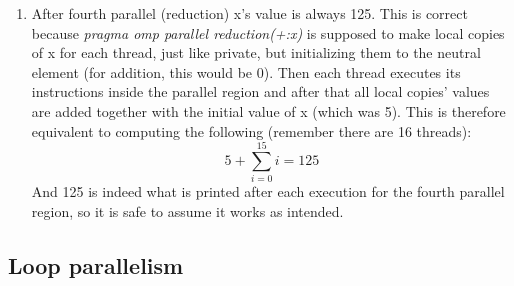 \documentclass[12]{article}
\begin{document}
\begin{enumerate}
    \item After fourth parallel (reduction) x's value is always 125. This is correct because \textit{pragma omp parallel reduction(+:x)} is supposed to make local copies of x for each thread, just like private, but initializing them to the neutral element (for addition, this would be 0). Then each thread executes its instructions inside the parallel region and after that all local copies' values are added together with the initial value of x (which was 5). This is therefore equivalent to computing the following (remember there are 16 threads): 
    \begin{equation}
        5 + \sum_{i=0}^{15} i = 125
    \end{equation}
    And 125 is indeed what is printed after each execution for the fourth parallel region, so it is safe to assume it works as intended.
    
\end{enumerate}

\subsection{Loop parallelism}
\end{document}
